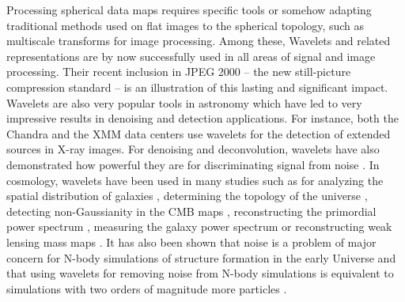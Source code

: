 Processing spherical data maps requires specific tools or somehow adapting traditional methods used on flat images to the spherical 
topology, such as multiscale transforms for image processing. Among these, Wavelets and related representations are by now successfully 
used in all areas of signal and image processing. Their recent inclusion in JPEG 2000 -- the new still-picture compression standard -- 
is an illustration of this lasting and significant impact. Wavelets are also very popular tools in astronomy \citep{starck:book02} which 
have led to very impressive results in denoising and detection applications. For instance, both the Chandra and the XMM data centers 
use wavelets for the detection of extended sources in X-ray images. For denoising and deconvolution, wavelets have also demonstrated 
how powerful they are for discriminating signal from noise \citep{starck:sta02_2}. In cosmology, wavelets have been used in many studies 
such as for analyzing the spatial distribution of galaxies \citep{astro:slezak93,astro:escalera95,starck:sta05_3,starck:martinez05}, 
determining the topology of the universe \citep{astro:rocha04}, detecting non-Gaussianity in the CMB maps \citep{gauss:aghanim99,gauss:barreiro01_1,wave:vielva04,starck:sta03_1},
reconstructing the primordial power spectrum \citep{astro:pia03}, measuring the galaxy power spectrum \citep{astro:fang00} or reconstructing 
weak lensing mass maps \citep{wlens:starck06}. It has also been shown that noise is a problem of major concern for N-body simulations of 
structure formation in the early Universe and that using wavelets for removing noise from N-body simulations is equivalent to simulations 
with two orders of magnitude more particles \citep{rest:romeo03,rest:romeo04}. 

